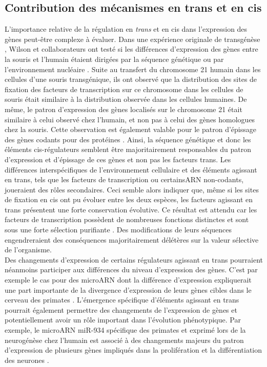 \subsection{Contribution des mécanismes en \gls{trans} et en \gls{cis}}
\label{subsec:contrib-cis-trans}

L’importance relative de la régulation en \textit{trans} et en \gls{cis} dans l’expression des gènes peut-être complexe à évaluer. Dans une expérience originale de transgénèse , Wilson et collaborateurs ont testé si les différences d’expression des gènes entre la souris et l’humain étaient dirigées par la séquence génétique ou par l’environnement nucléaire \citep{wilson_species-specific_2008}. Suite au transfert du chromosome 21 humain dans les cellules d’une souris transgénique, ils ont observé que la distribution des sites de fixation des facteurs de transcription sur ce chromosome dans les cellules de souris était similaire à la distribution observée dans les cellules humaines. De même, le patron d’expression des gènes localisés sur le chromosome 21 était similaire à celui observé chez l’humain, et non pas à celui des gènes homologues chez la souris. Cette observation est également valable pour le patron d’épissage des gènes codants pour des protéines \citep{barbosa-morais_evolutionary_2012}. Ainsi, la séquence génétique et donc les éléments \gls{cis}-régulateurs semblent être majoritairement responsables du patron d’expression et d’épissage de ces gènes et non pas les facteurs trans. Les différences interspécifiques de l’environnement cellulaire et des éléments agissant en trans, tels que les facteurs de transcription ou certains\acrshort{ARN} non-codants, joueraient des rôles secondaires. Ceci semble alors indiquer que, même si les sites de fixation en cis ont pu évoluer entre les deux espèces, les facteurs agissant en trans présentent une forte conservation évolutive. Ce résultat est attendu car les facteurs de transcription possèdent de nombreuses fonctions distinctes et sont sous une forte sélection purifiante \citep{wray_evolutionary_2007}. Des modifications de leurs séquences engendreraient des conséquences majoritairement délétères sur la valeur sélective de l’organisme. \\

Des changements d’expression de certains régulateurs agissant en trans pourraient néanmoins participer aux différences du niveau d’expression des gènes. C’est par exemple le cas pour des microARN dont la différence d’expression expliquerait une part importante de la divergence d’expression de leurs gènes cibles dans le cerveau des primates \citep{hu_microrna_2011}. L’émergence spécifique d’éléments agissant en trans pourrait également permettre des changements de l’expression de gènes et potentiellement avoir un rôle important dans l'évolution phénotypique. Par exemple, le microARN miR-934 spécifique des primates et exprimé lors de la neurogénèse chez l’humain est associé à des changements majeurs du patron d’expression de plusieurs gènes impliqués dans la prolifération et la différentiation des neurones \citep{prodromidou_microrna-934_2020}.

